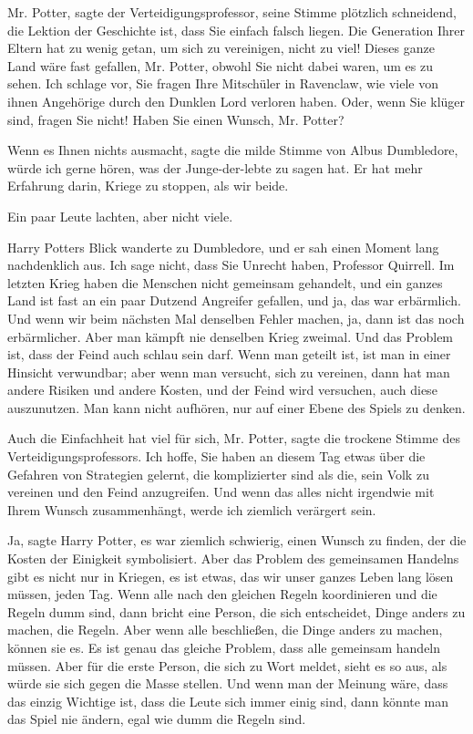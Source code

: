 \glqq{}Mr. Potter\grqq{}, sagte der Verteidigungsprofessor, seine Stimme
plötzlich schneidend, \glqq{}die Lektion der Geschichte ist, dass Sie einfach
falsch liegen. Die Generation Ihrer Eltern hat zu wenig getan, um sich zu
vereinigen, nicht zu viel! Dieses ganze Land wäre fast gefallen, Mr. Potter,
obwohl Sie nicht dabei waren, um es zu sehen. Ich schlage vor, Sie fragen Ihre
Mitschüler in Ravenclaw, wie viele von ihnen Angehörige durch den Dunklen Lord
verloren haben. Oder, wenn Sie klüger sind, fragen Sie nicht! Haben Sie einen
Wunsch, Mr. Potter?\grqq{}

\glqq{}Wenn es Ihnen nichts ausmacht\grqq{}, sagte die milde Stimme von Albus
Dumbledore, \glqq{}würde ich gerne hören, was der Junge-der-lebte zu sagen hat.
Er hat mehr Erfahrung darin, Kriege zu stoppen, als wir beide.\grqq{}

Ein paar Leute lachten, aber nicht viele.

Harry Potters Blick wanderte zu Dumbledore, und er sah einen Moment lang
nachdenklich aus. \glqq{}Ich sage nicht, dass Sie Unrecht haben, Professor
Quirrell. Im letzten Krieg haben die Menschen nicht gemeinsam gehandelt, und ein
ganzes Land ist fast an ein paar Dutzend Angreifer gefallen, und ja, das war
erbärmlich. Und wenn wir beim nächsten Mal denselben Fehler machen, ja, dann ist
das noch erbärmlicher. Aber man kämpft nie denselben Krieg zweimal. Und das
Problem ist, dass der Feind auch schlau sein darf. Wenn man geteilt ist, ist man
in einer Hinsicht verwundbar; aber wenn man versucht, sich zu vereinen, dann hat
man andere Risiken und andere Kosten, und der Feind wird versuchen, auch diese
auszunutzen. Man kann nicht aufhören, nur auf einer Ebene des Spiels zu denken.\grqq{}

\glqq{}Auch die Einfachheit hat viel für sich, Mr. Potter\grqq{}, sagte die
trockene Stimme des Verteidigungsprofessors. \glqq{}Ich hoffe, Sie haben an
diesem Tag etwas über die Gefahren von Strategien gelernt, die komplizierter
sind als die, sein Volk zu vereinen und den Feind anzugreifen. Und wenn das
alles nicht irgendwie mit Ihrem Wunsch zusammenhängt, werde ich ziemlich
verärgert sein.\grqq{}

\glqq{}Ja\grqq{}, sagte Harry Potter, \glqq{}es war ziemlich schwierig, einen
Wunsch zu finden, der die Kosten der Einigkeit symbolisiert. Aber das Problem
des gemeinsamen Handelns gibt es nicht nur in Kriegen, es ist etwas, das wir
unser ganzes Leben lang lösen müssen, jeden Tag. Wenn alle nach den gleichen
Regeln koordinieren und die Regeln dumm sind, dann bricht eine Person, die sich
entscheidet, Dinge anders zu machen, die Regeln. Aber wenn alle beschließen, die
Dinge anders zu machen, können sie es. Es ist genau das gleiche Problem, dass
alle gemeinsam handeln müssen. Aber für die erste Person, die sich zu Wort
meldet, sieht es so aus, als würde sie sich gegen die Masse stellen. Und wenn
man der Meinung wäre, dass das einzig Wichtige ist, dass die Leute sich immer
einig sind, dann könnte man das Spiel nie ändern, egal wie dumm die Regeln sind.

